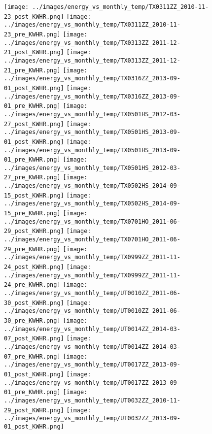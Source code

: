 \clearpage
\begin{figure}
\centering
\texttt{[image: ../images/energy\_vs\_monthly\_temp/TX0311ZZ\_2010-11-23\_post\_KWHR.png]}
\texttt{[image: ../images/energy\_vs\_monthly\_temp/TX0311ZZ\_2010-11-23\_pre\_KWHR.png]}
\texttt{[image: ../images/energy\_vs\_monthly\_temp/TX0313ZZ\_2011-12-21\_post\_KWHR.png]}
\texttt{[image: ../images/energy\_vs\_monthly\_temp/TX0313ZZ\_2011-12-21\_pre\_KWHR.png]}
\texttt{[image: ../images/energy\_vs\_monthly\_temp/TX0316ZZ\_2013-09-01\_post\_KWHR.png]}
\texttt{[image: ../images/energy\_vs\_monthly\_temp/TX0316ZZ\_2013-09-01\_pre\_KWHR.png]}
\texttt{[image: ../images/energy\_vs\_monthly\_temp/TX0501HS\_2012-03-27\_post\_KWHR.png]}
\texttt{[image: ../images/energy\_vs\_monthly\_temp/TX0501HS\_2013-09-01\_post\_KWHR.png]}
\texttt{[image: ../images/energy\_vs\_monthly\_temp/TX0501HS\_2013-09-01\_pre\_KWHR.png]}
\texttt{[image: ../images/energy\_vs\_monthly\_temp/TX0501HS\_2012-03-27\_pre\_KWHR.png]}
\texttt{[image: ../images/energy\_vs\_monthly\_temp/TX0502HS\_2014-09-15\_post\_KWHR.png]}
\texttt{[image: ../images/energy\_vs\_monthly\_temp/TX0502HS\_2014-09-15\_pre\_KWHR.png]}
\texttt{[image: ../images/energy\_vs\_monthly\_temp/TX0701HO\_2011-06-29\_post\_KWHR.png]}
\texttt{[image: ../images/energy\_vs\_monthly\_temp/TX0701HO\_2011-06-29\_pre\_KWHR.png]}
\texttt{[image: ../images/energy\_vs\_monthly\_temp/TX0999ZZ\_2011-11-24\_post\_KWHR.png]}
\texttt{[image: ../images/energy\_vs\_monthly\_temp/TX0999ZZ\_2011-11-24\_pre\_KWHR.png]}
\texttt{[image: ../images/energy\_vs\_monthly\_temp/UT0010ZZ\_2011-06-30\_post\_KWHR.png]}
\texttt{[image: ../images/energy\_vs\_monthly\_temp/UT0010ZZ\_2011-06-30\_pre\_KWHR.png]}
\texttt{[image: ../images/energy\_vs\_monthly\_temp/UT0014ZZ\_2014-03-07\_post\_KWHR.png]}
\texttt{[image: ../images/energy\_vs\_monthly\_temp/UT0014ZZ\_2014-03-07\_pre\_KWHR.png]}
\texttt{[image: ../images/energy\_vs\_monthly\_temp/UT0017ZZ\_2013-09-01\_post\_KWHR.png]}
\texttt{[image: ../images/energy\_vs\_monthly\_temp/UT0017ZZ\_2013-09-01\_pre\_KWHR.png]}
\texttt{[image: ../images/energy\_vs\_monthly\_temp/UT0032ZZ\_2010-11-29\_post\_KWHR.png]}
\texttt{[image: ../images/energy\_vs\_monthly\_temp/UT0032ZZ\_2013-09-01\_post\_KWHR.png]}
\end{figure}
